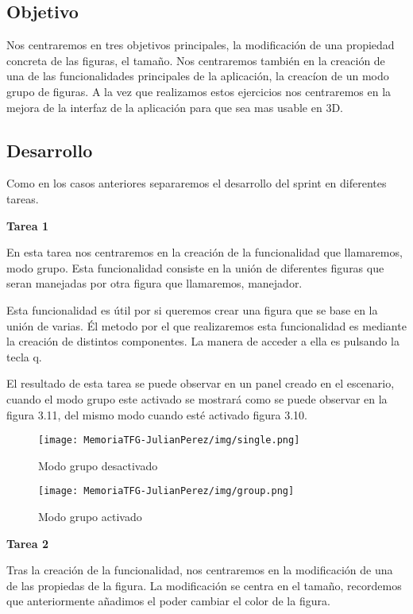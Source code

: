 \documentclass[a4paper, 12pt]{book}
\begin{document}
\subsection{Objetivo}
Nos centraremos en tres objetivos principales, la modificación de una propiedad concreta de las figuras, el tamaño. Nos centraremos también en la creación de una de las funcionalidades principales de la aplicación, la creacíon de un modo grupo de figuras. A la vez que realizamos estos ejercicios nos centraremos en la mejora de la interfaz de la aplicación para que sea mas usable en 3D.

\subsection{Desarrollo}
Como en los casos anteriores separaremos el desarrollo del sprint en diferentes tareas.

\textbf{Tarea 1}

En esta tarea nos centraremos en la creación de la funcionalidad que llamaremos, modo grupo. Esta funcionalidad consiste en la unión de diferentes figuras que seran manejadas por otra figura que llamaremos, manejador. 

Esta funcionalidad es útil por si queremos crear una figura que se base en la unión de varias. Él metodo por el que realizaremos esta funcionalidad es mediante la creación de distintos componentes. La manera de acceder a ella es pulsando la tecla q. 

El resultado de esta tarea se puede observar en un panel creado en el escenario, cuando el modo grupo este activado se mostrará como se puede observar en la figura 3.11, del mismo modo cuando esté activado figura 3.10.

\begin{figure}[H]
  \centering
  \begin{minipage}[b]{0.4\textwidth}
 \texttt{[image: MemoriaTFG-JulianPerez/img/single.png]}
  \caption{Modo grupo desactivado}\label{single}
  \end{minipage}
  \hfill
  \begin{minipage}[b]{0.4\textwidth}
  \texttt{[image: MemoriaTFG-JulianPerez/img/group.png]}
  \caption{Modo grupo activado}\label{scrum}
  \end{minipage}
\end{figure}

\textbf{Tarea 2}

Tras la creación de la funcionalidad, nos centraremos en la modificación de una de las propiedas de la figura. La modificación se centra en el tamaño, recordemos que anteriormente añadimos el poder cambiar el color de la figura.
\end{document}
